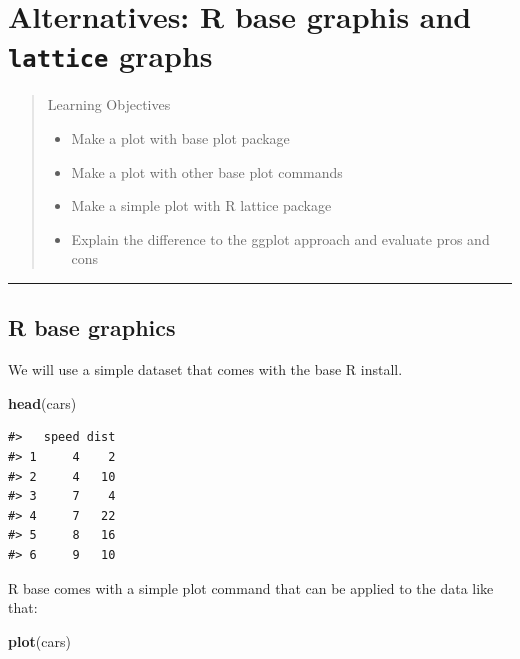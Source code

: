 \documentclass[]{book}
\newenvironment{Shaded}{\begin{snugshade}}{\end{snugshade}}
\newcommand{\KeywordTok}[1]{\textcolor[rgb]{0.13,0.29,0.53}{\textbf{#1}}}
\newcommand{\NormalTok}[1]{#1}
\providecommand{\tightlist}{%
  \setlength{\itemsep}{0pt}\setlength{\parskip}{0pt}}
\theoremstyle{definition}
\theoremstyle{definition}
\theoremstyle{definition}
\theoremstyle{remark}
\begin{document}
\chapter{\texorpdfstring{Alternatives: R base graphis and
\texttt{lattice}
graphs}{Alternatives: R base graphis and lattice graphs}}\label{baseplot}

\begin{quote}
Learning Objectives

\begin{itemize}
\tightlist
\item
  Make a plot with base plot package
\item
  Make a plot with other base plot commands
\item
  Make a simple plot with R lattice package
\item
  Explain the difference to the ggplot approach and evaluate pros and
  cons
\end{itemize}
\end{quote}

\begin{center}\rule{0.5\linewidth}{\linethickness}\end{center}

\section{R base graphics}\label{r-base-graphics}

We will use a simple dataset that comes with the base R install.

\begin{Shaded}
\begin{Highlighting}[]
\KeywordTok{head}\NormalTok{(cars)}
\end{Highlighting}
\end{Shaded}

\begin{verbatim}
#>   speed dist
#> 1     4    2
#> 2     4   10
#> 3     7    4
#> 4     7   22
#> 5     8   16
#> 6     9   10
\end{verbatim}

R base comes with a simple plot command that can be applied to the data
like that:

\begin{Shaded}
\begin{Highlighting}[]
\KeywordTok{plot}\NormalTok{(cars)}
\end{Highlighting}
\end{Shaded}
\end{document}
